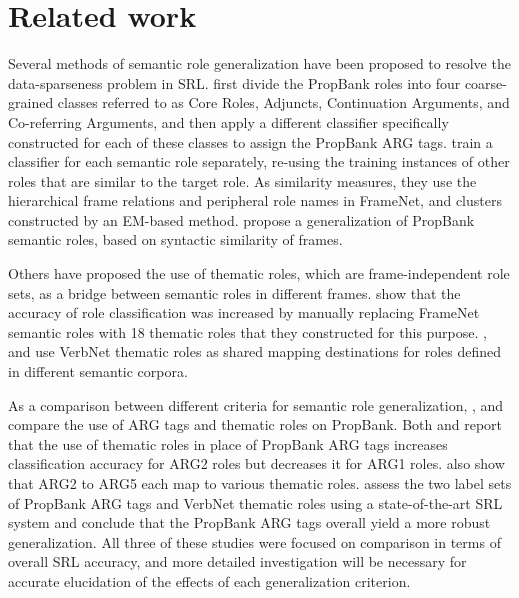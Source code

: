 \documentclass[english]{jnlp_1.4_rep}
\begin{document}
\section{Related work}

Several methods of semantic role generalization have been proposed to resolve the data-sparseness problem in SRL.  first divide the PropBank roles into four coarse-grained classes referred to as Core Roles, Adjuncts, Continuation Arguments, and Co-referring Arguments, and then apply a different classifier specifically constructed for each of these classes to assign the PropBank ARG tags.  train a classifier for each semantic role separately, re-using the training instances of other roles that are similar to the target role. As similarity measures, they use the hierarchical frame relations and peripheral role names in FrameNet, and clusters constructed by an EM-based method.  propose a generalization of PropBank semantic roles, based on syntactic similarity of frames.

Others have proposed the use of thematic roles, which are frame-independent role sets, as a bridge between semantic roles in different frames.  show that the accuracy of role classification was increased by manually replacing FrameNet semantic roles with 18 thematic roles that they constructed for this purpose. , and  use VerbNet thematic roles as shared mapping destinations for roles defined in different semantic corpora.

As a comparison between different criteria for semantic role generalization, , and  compare the use of ARG tags and thematic roles on PropBank. Both  and  report that the use of thematic roles in place of PropBank ARG tags increases classification accuracy for ARG2 roles but decreases it for ARG1 roles.  also show that ARG2 to ARG5 each map to various thematic roles.  assess the two label sets of PropBank ARG tags and VerbNet thematic roles using a state-of-the-art SRL system and conclude that the PropBank ARG tags overall yield a more robust generalization. All three of these studies were focused on comparison in terms of overall SRL accuracy, and more detailed investigation will be necessary for accurate elucidation of the effects of each generalization criterion.
\end{document}
